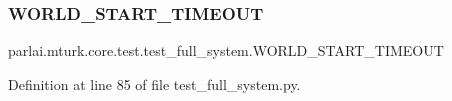 \subsubsection{\texorpdfstring{W\+O\+R\+L\+D\+\_\+\+S\+T\+A\+R\+T\+\_\+\+T\+I\+M\+E\+O\+UT}{WORLD\_START\_TIMEOUT}}
{\footnotesize\ttfamily parlai.\+mturk.\+core.\+test.\+test\+\_\+full\+\_\+system.\+W\+O\+R\+L\+D\+\_\+\+S\+T\+A\+R\+T\+\_\+\+T\+I\+M\+E\+O\+UT}



Definition at line 85 of file test\+\_\+full\+\_\+system.\+py.


